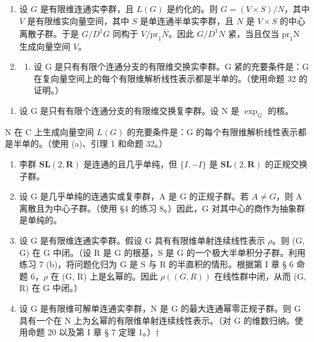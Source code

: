 \begin{enumerate}
\def\labelenumi{\arabic{enumi}.}
\setcounter{enumi}{21}
\item
  设 \(G\) 是有限维连通实李群，且 \(L(G)\) 是约化的。则 \(G = (V \times S)/N\)，其中 \(V\) 是有限维实向量空间，其中 \(S\) 是单连通半单实李群，且 \(N\) 是 \(V \times S\) 的中心离散子群。于是 \(G/\overline{D^1}G\) 同构于 \(V/\mathrm{pr}_1\overline{N}\)。因此 \(G/\overline{D^1}N\) 紧，当且仅当 \(\mathrm{pr}_1\mathrm{N}\) 生成向量空间 \(V\)。
\item
  \begin{enumerate}
  \def\labelenumii{(\alph{enumii})}
  \tightlist
  \item
    设 G 是只有有限个连通分支的有限维交换实李群。G 紧的充要条件是：G 在复向量空间上的每个有限维解析线性表示都是半单的。（使用命题 32 的证明。）
  \end{enumerate}
\end{enumerate}

\begin{enumerate}
\def\labelenumi{(\alph{enumi})}
\setcounter{enumi}{1}
\tightlist
\item
  设 G 是只有有限个连通分支的有限维交换复李群。设 N 是 \(\exp_{G}\) 的核。
\end{enumerate}

N 在 C 上生成向量空间 \(L(G)\) 的充要条件是：G 的每个有限维解析线性表示都是半单的。（使用 (a)、引理 1 和命题 32。）

\begin{enumerate}
\def\labelenumi{\arabic{enumi}.}
\setcounter{enumi}{23}
\item
  李群 \(\mathbf{SL}(2,\mathbf{R})\) 是连通的且几乎单纯，但 \(\{I,-I\}\) 是 \(\mathbf{SL}(2,\mathbf{R})\) 的正规交换子群。
\item
  设 G 是几乎单纯的连通实或复李群，A 是 G 的正规子群。若 \(A \neq G\)，则 A 离散且为中心子群。（使用 §4 的练习 8。）因此，G 对其中心的商作为抽象群是单纯的。
\item
 设 G 是有限维连通实李群。假设 G 具有有限维单射连续线性表示 \(\rho\)。则 (G, G) 在 G 中闭。（设 R 是 G 的根基，S 是 G 的一个极大半单积分子群。利用练习 7 (b)，将问题化归为 G 是 S 与 R 的半直积的情形。根据第 I 章 § 6 命题 6，\(\rho\) 在 (G, R) 上是幺幂的。因此 \(\rho((G, R))\) 在线性群中闭，从而 (G, R) 在 G 中闭。）
\item
  设 G 是有限维可解单连通实李群，N 是 G 的最大连通幂零正规子群。则 G 具有一个在 N 上为幺幂的有限维单射连续线性表示。（对 G 的维数归纳。使用命题 20 以及第 I 章 § 7 定理 1。）†
\end{enumerate}

